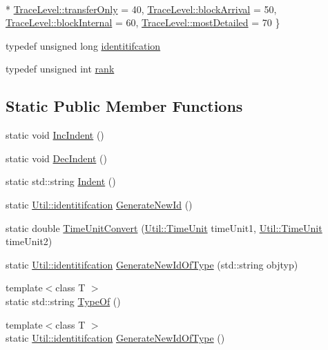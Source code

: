 \begin{DoxyCompactItemize}
\\*
\hyperlink{class_util_a0a3482cfa2d915e261c0cf528fdc7afca0a2e7262b7e0ff948fd4a57e7cb178b6}{Trace\+Level\+::transfer\+Only} = 40, 
\hyperlink{class_util_a0a3482cfa2d915e261c0cf528fdc7afcaa784e286f1dae00f9b31823faa5ee90b}{Trace\+Level\+::block\+Arrival} = 50, 
\hyperlink{class_util_a0a3482cfa2d915e261c0cf528fdc7afca08756a99ac8340cce8bab9de954d738e}{Trace\+Level\+::block\+Internal} = 60, 
\hyperlink{class_util_a0a3482cfa2d915e261c0cf528fdc7afcaac18d2ea075dba67f95df9a907eee741}{Trace\+Level\+::most\+Detailed} = 70
 \}
\item 
typedef unsigned long \hyperlink{class_util_ad17d458d9344b10bba64347e514d6d71}{identitifcation}
\item 
typedef unsigned int \hyperlink{class_util_a2a402b3a3a889d699bb3a1a87cbe6d1e}{rank}
\end{DoxyCompactItemize}
\subsection*{Static Public Member Functions}
\begin{DoxyCompactItemize}
\item 
static void \hyperlink{class_util_a8110241a80979c8fbecca95eef59e9ad}{Inc\+Indent} ()
\item 
static void \hyperlink{class_util_a702d44544c3dd604b81e578ee9ee713f}{Dec\+Indent} ()
\item 
static std\+::string \hyperlink{class_util_a13a4cb5dbc88ef5e2c3a127362b956d6}{Indent} ()
\item 
static \hyperlink{class_util_ad17d458d9344b10bba64347e514d6d71}{Util\+::identitifcation} \hyperlink{class_util_a59ecba8027c38a9d0a3a0e9e9dc94ad7}{Generate\+New\+Id} ()
\item 
static double \hyperlink{class_util_a5f537febaa83db4721745a4730657bab}{Time\+Unit\+Convert} (\hyperlink{class_util_a28504cc2fecc9aa47154cba4e625ec6f}{Util\+::\+Time\+Unit} time\+Unit1, \hyperlink{class_util_a28504cc2fecc9aa47154cba4e625ec6f}{Util\+::\+Time\+Unit} time\+Unit2)
\item 
static \hyperlink{class_util_ad17d458d9344b10bba64347e514d6d71}{Util\+::identitifcation} \hyperlink{class_util_a96dd76236d7f5888b8dac562e93f9278}{Generate\+New\+Id\+Of\+Type} (std\+::string objtyp)
\item 
{\footnotesize template$<$class T $>$ }\\static std\+::string \hyperlink{class_util_a1010d1207367e48e1d417381f32abf1f}{Type\+Of} ()
\item 
{\footnotesize template$<$class T $>$ }\\static \hyperlink{class_util_ad17d458d9344b10bba64347e514d6d71}{Util\+::identitifcation} \hyperlink{class_util_aec5f31f4f467113c25a6aef7bb5f4a40}{Generate\+New\+Id\+Of\+Type} ()
\end{DoxyCompactItemize}


